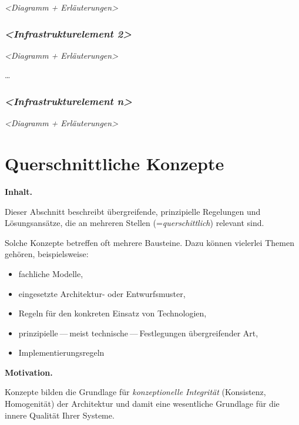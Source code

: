 \documentclass[]{article}
\begin{document}
\emph{\textless{}Diagramm + Erläuterungen\textgreater{}}

\hypertarget{__emphasis_infrastrukturelement_2_emphasis}{%
\subsubsection{\texorpdfstring{\emph{\textless{}Infrastrukturelement
2\textgreater{}}}{\textless{}Infrastrukturelement 2\textgreater{}}}\label{__emphasis_infrastrukturelement_2_emphasis}}

\emph{\textless{}Diagramm + Erläuterungen\textgreater{}}

\ldots{}

\hypertarget{__emphasis_infrastrukturelement_n_emphasis}{%
\subsubsection{\texorpdfstring{\emph{\textless{}Infrastrukturelement
n\textgreater{}}}{\textless{}Infrastrukturelement n\textgreater{}}}\label{__emphasis_infrastrukturelement_n_emphasis}}

\emph{\textless{}Diagramm + Erläuterungen\textgreater{}}

\hypertarget{section-concepts}{%
\section{Querschnittliche Konzepte}\label{section-concepts}}

\textbf{Inhalt.}

Dieser Abschnitt beschreibt übergreifende, prinzipielle Regelungen und
Lösungsansätze, die an mehreren Stellen (=\emph{querschittlich})
relevant sind.

Solche Konzepte betreffen oft mehrere Bausteine. Dazu können vielerlei
Themen gehören, beispielsweise:

\begin{itemize}
\item
  fachliche Modelle,
\item
  eingesetzte Architektur- oder Entwurfsmuster,
\item
  Regeln für den konkreten Einsatz von Technologien,
\item
  prinzipielle --- meist technische --- Festlegungen übergreifender Art,
\item
  Implementierungsregeln
\end{itemize}

\textbf{Motivation.}

Konzepte bilden die Grundlage für \emph{konzeptionelle Integrität}
(Konsistenz, Homogenität) der Architektur und damit eine wesentliche
Grundlage für die innere Qualität Ihrer Systeme.
\end{document}
